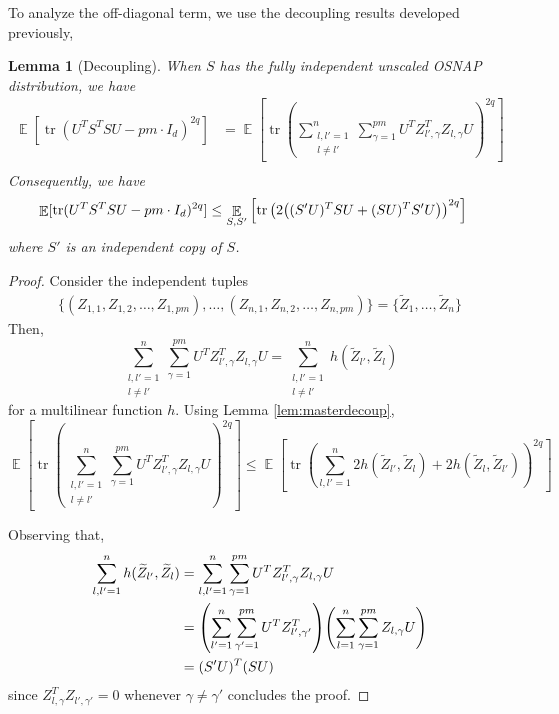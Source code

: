 \documentclass[11pt]{amsart}
\numberwithin{equation}{section}
\numberwithin{equation}{section}
\DeclareMathOperator{\E}{\mathbb{E}}
\DeclareMathOperator*{\tr}{tr}
\def \etc {,\ldots,}
\DeclarePairedDelimiter{\paren}{(}{)}
\newtheorem{lemma}[theorem]{Lemma}
\begin{document}
To analyze the off-diagonal term, we use the decoupling results developed previously, 

\begin{lemma}[Decoupling] \label{lem:decoup}
When $S$ has the fully independent unscaled OSNAP distribution, we have
\begin{align*}
    \E [ \tr (U^TS^TSU - pm\cdot I_d)^{2q} ] &= \E \left[ \tr \left( \sum_{\substack{l, l'=1 \\ l\neq l'}}^n \sum_{\gamma=1}^{pm} U^T Z_{l',\gamma} ^T Z_{l,\gamma}  U  \right)^{2q} \right] \\
\end{align*}
Consequently, we have
\begin{align*}
    \E [ \tr (U^TS^TSU - pm\cdot I_d)^{2q} ] &\le \E_{S,S'} \left[ \tr \left(  2\paren*{(S'U)^TSU + (SU)^TS'U} \right)^{2q} \right]
\end{align*}
where $S'$ is an independent copy of $S$.
\end{lemma}
\begin{proof}

Consider the independent tuples 
\begin{align*}
   \{ (Z_{1,1}, Z_{1,2} \etc Z_{1, pm} ) \etc (Z_{n,1}, Z_{n,2} \etc Z_{n, pm} )\} = \{ \widetilde{Z}_1 \etc \widetilde{Z}_n \}
\end{align*}
Then, 
\[ \sum_{\substack{l, l'=1 \\ l\neq l'}}^n \sum_{\gamma=1}^{pm} U^T Z_{l',\gamma} ^T Z_{l,\gamma}  U = \sum_{\substack{l, l'=1 \\ l\neq l'}}^n h(\widetilde{Z}_{l'}, \widetilde{Z}_{l}) \]
for a multilinear function $h$. Using Lemma \ref{lem:masterdecoup},
\[ \E \left[ \tr \left( \sum_{\substack{l, l'=1 \\ l\neq l'}}^n \sum_{\gamma=1}^{pm} U^T Z_{l',\gamma} ^T Z_{l,\gamma}  U  \right)^{2q} \right] \le \E \left[ \tr \left( \sum_{l, l' = 1}^n 2h(\widetilde{Z}_{l'}, \widetilde{Z}_{l}) + 2h(\widetilde{Z}_{l}, \widetilde{Z}_{l'})  \right)^{2q} \right] \]

Observing that, 
\begin{align*}
    \sum_{l, l' = 1}^n h(\widetilde{Z}_{l'}, \widetilde{Z}_{l}) &=  \sum_{l, l'=1 }^n \sum_{\gamma=1}^{pm} U^T Z_{l',\gamma} ^T Z_{l,\gamma}  U \\
    &= \paren*{ \sum_{l'=1 }^n \sum_{\gamma'=1}^{pm} U^T Z_{l',\gamma'} ^T } \paren*{ \sum_{l=1}^n \sum_{\gamma=1}^{pm} Z_{l,\gamma} U } \\
    &= (S'U)^T(SU)
\end{align*}
since $Z_{l,\gamma}^T Z_{l',\gamma'} = 0$ whenever $\gamma \neq \gamma'$ concludes the proof.
\end{proof}
\end{document}
